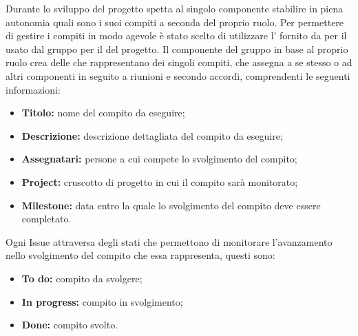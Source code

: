 Durante lo sviluppo del progetto spetta al singolo componente stabilire in piena autonomia quali sono i suoi compiti a seconda del proprio ruolo.
Per permettere di gestire i compiti in modo agevole è stato scelto di utilizzare l' fornito da  per il  usato dal gruppo per il  del progetto.
Il componente del gruppo in base al proprio ruolo crea delle  che rappresentano dei singoli compiti, che assegna a se stesso o ad altri componenti in seguito a riunioni e secondo accordi, comprendenti le seguenti informazioni:
\begin{itemize}
	\item \textbf{Titolo:} nome del compito da eseguire;
	\item \textbf{Descrizione:} descrizione dettagliata del compito da eseguire;
	\item \textbf{Assegnatari:} persone a cui compete lo svolgimento del compito;
	\item \textbf{Project:} cruscotto di progetto in cui il compito sarà monitorato;
	\item \textbf{Milestone:} data entro la quale lo svolgimento del compito deve essere completato.
\end{itemize}
Ogni Issue attraversa degli stati che permettono di monitorare l'avanzamento nello svolgimento del compito che essa rappresenta, questi sono:
\begin{itemize}
	\item \textbf{To do:} compito da svolgere;
	\item \textbf{In progress:} compito in svolgimento;
	\item \textbf{Done:} compito svolto.
\end{itemize}

